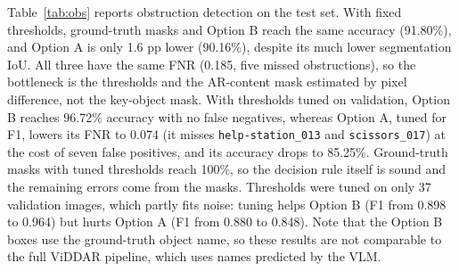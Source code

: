 \documentclass[conference]{IEEEtran}
\begin{document}
\begin{table}[t]
\centering
\caption{Obstruction detection on the test set (61 images, 27 obstructed). Fixed = ratio threshold 0.25 (as in ViDDAR) and pixel-difference threshold 30 (ours); tuned = (pixel difference, ratio) selected on validation by F1. Option B boxes come from Grounding DINO prompted with the ground-truth object name. The AR-content mask is always estimated by pixel difference.}
\label{tab:obs}
\end{table}

Table~\ref{tab:obs} reports obstruction detection on the test set. With fixed thresholds, ground-truth masks and Option B reach the same accuracy (91.80\%), and Option A is only 1.6 pp lower (90.16\%), despite its much lower segmentation IoU. All three have the same FNR (0.185, five missed obstructions), so the bottleneck is the thresholds and the AR-content mask estimated by pixel difference, not the key-object mask. With thresholds tuned on validation, Option B reaches 96.72\% accuracy with no false negatives, whereas Option A, tuned for F1, lowers its FNR to 0.074 (it misses \texttt{help-station\_013} and \texttt{scissors\_017}) at the cost of seven false positives, and its accuracy drops to 85.25\%. Ground-truth masks with tuned thresholds reach 100\%, so the decision rule itself is sound and the remaining errors come from the masks. Thresholds were tuned on only 37 validation images, which partly fits noise: tuning helps Option B (F1 from 0.898 to 0.964) but hurts Option A (F1 from 0.880 to 0.848). Note that the Option B boxes use the ground-truth object name, so these results are not comparable to the full ViDDAR pipeline, which uses names predicted by the VLM.
\end{document}
